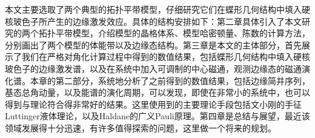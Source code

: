 本文主要选取了两个典型的拓扑平带模型，仔细研究它们在蝶形几何结构中填入硬核玻色子所产生的边缘激发效应。具体的结构安排如下：第二章具体引入了本文研究的两个拓扑平带模型，介绍模型的晶格体系、模型哈密顿量、陈数的计算方法，分别画出了两个模型的体能带以及边缘态结构。第三章是本文的主体部分，首先展示了我们在严格对角化计算过程中得到的数值结果，包括蝶形几何结构中填入硬核玻色子的边缘激发谱，以及在系统中加入可调制的中心磁通，观测边缘态的磁通演化谱。本章的第二部分，系统地分析了之前得到的数值结果，包括边缘简并序列，基态总角动量，以及能谱的演化周期，可以发现，即使在非常小的系统中，也可以得到与理论符合得非常好的结果。这里使用到的主要理论手段包括文小刚的手征Luttinger液体理论，以及Haldane的广义Pauli原理。第四章是总结与展望，最近该领域发展得十分迅速，有许多值得探索的问题，这里做一个将来的规划。